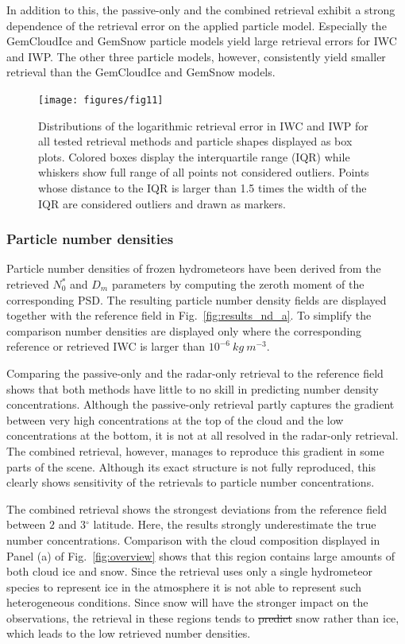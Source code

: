 \documentclass[journal abbreviation, manuscript]{copernicus}
\providecommand{\DIFadd}[1]{{\protect\color{blue}\uwave{#1}}} %
\providecommand{\DIFdel}[1]{{\protect\color{red}\sout{#1}}}                      %
\providecommand{\DIFaddbegin}{} %
\providecommand{\DIFaddend}{} %
\providecommand{\DIFdelbegin}{} %
\providecommand{\DIFdelend}{} %
\begin{document}
In addition to this, the passive-only and the combined retrieval exhibit a
strong dependence of the retrieval error on the applied particle model.
Especially the GemCloudIce and GemSnow particle models yield large retrieval
errors for IWC and IWP. The other three particle models, however, consistently
yield smaller retrieval than the GemCloudIce and GemSnow models.


\begin{figure}[!h]
\centering
\texttt{[image: figures/fig11]}
\caption{Distributions of the logarithmic retrieval error in IWC and IWP for all tested retrieval
  methods and particle shapes displayed as box plots. Colored boxes display the interquartile range (IQR)
  while whiskers show full range of all points not considered outliers. Points whose distance to
  the IQR is larger than 1.5 times the width of the IQR are considered outliers and drawn as markers.}
\label{fig:boxes}
\end{figure}

\subsubsection{Particle number densities}

Particle number densities of frozen hydrometeors have been derived from the
retrieved $N_0^*$ and $D_m$ parameters by computing the zeroth moment of the
corresponding PSD. The resulting particle number density fields are displayed
together with the reference field in Fig.~\ref{fig:results_nd_a}. To simplify
the comparison number densities are displayed only where the corresponding
reference or retrieved IWC is larger than $10^{-6}\ \unit{kg\ m^{-3}}$.

Comparing the passive-only and the radar-only retrieval to the reference field
shows that both methods have little to no skill in predicting number density
concentrations. Although the passive-only retrieval partly captures the
gradient between very high concentrations at the top of the cloud and the low
concentrations at the bottom, it is not at all resolved in the radar-only
retrieval. The combined retrieval, however, manages to reproduce this gradient
in some parts of the scene. Although its exact structure is not fully
reproduced, this clearly shows sensitivity of the retrievals to particle number
concentrations.

The combined retrieval shows the strongest deviations from the reference field
between $2$ and $3\unit{^\circ}$ latitude. Here, the results strongly
underestimate the true number concentrations. Comparison with the cloud
composition displayed in Panel (a) of Fig.~\ref{fig:overview} shows that this
region contains large amounts of both cloud ice and snow. Since the retrieval
uses only a single hydrometeor species to represent ice in the atmosphere it is
not able to represent such heterogeneous conditions. Since snow will have the
stronger impact on the observations, the retrieval in these regions tends to
\DIFdelbegin \DIFdel{predict }\DIFdelend \DIFaddbegin \DIFadd{represent }\DIFaddend snow rather than ice, which leads to the low retrieved number densities.
\end{document}
